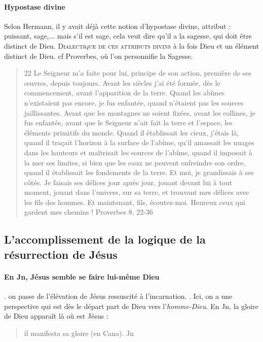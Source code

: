     \paragraph{Hypostase divine} Selon Hermann, il y avait déjà cette notion d'hypostase divine, attribut : puissant, sage,... mais s'il est sage, cela veut dire qu'il a la sagesse, qui doit être distinct de Dieu. \textsc{Dialectique de ces attributs divins} à la fois Dieu et un élément distinct de Dieu.
    cf Proverbes, où l'on personnifie la Sagesse.
    \begin{quote}
        22 Le Seigneur m’a faite pour lui, principe de son action, première de ses œuvres, depuis toujours.
 Avant les siècles j’ai été formée, dès le commencement, avant l’apparition de la terre.
 Quand les abîmes n’existaient pas encore, je fus enfantée, quand n’étaient pas les sources jaillissantes.
 Avant que les montagnes ne soient fixées, avant les collines, je fus enfantée, avant que le Seigneur n’ait fait la terre et l’espace, les éléments primitifs du monde.
Quand il établissait les cieux, j’étais là, quand il traçait l’horizon à la surface de l’abîme, qu’il amassait les nuages dans les hauteurs et maîtrisait les sources de l’abîme,
 quand il imposait à la mer ses limites, si bien que les eaux ne peuvent enfreindre son ordre, quand il établissait les fondements de la terre.
 Et moi, je grandissais à ses côtés. Je faisais ses délices jour après jour, jouant devant lui à tout moment,
 jouant dans l’univers, sur sa terre, et trouvant mes délices avec les fils des hommes.
 Et maintenant, fils, écoutez-moi. Heureux ceux qui gardent mes chemins !
Proverbes 8, 22-36
    \end{quote}
     
   
     
    \subsection{L'accomplissement de la logique de la résurrection de Jésus}
     
   \paragraph{En Jn, Jésus semble se faire lui-même Dieu}. on passe de l'élévation de Jésus ressuscité à l'incarnation. . Ici, on a une perspective qui est dès le départ part de Dieu vers l'\textit{homme-Dieu}.
   En Jn, la gloire de Dieu apparaît là où est Jésus : 
   \begin{quote}
       il manifesta sa gloire (en Cana).
       Jn
   \end{quote}
    
